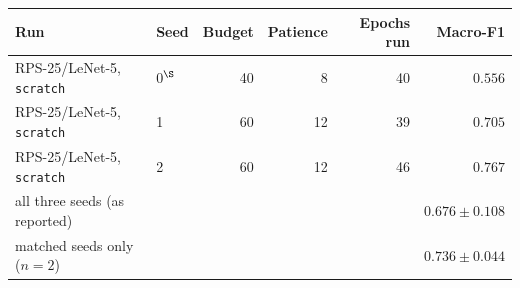 \begin{tabular}{@{}llrrrr@{}}
\toprule
Run & Seed & Budget & Patience & Epochs run & Macro-F1 \\
\midrule
RPS-25/LeNet-5, \texttt{scratch} & 0$^{\S}$ & 40 & 8 & 40 & $0.556$ \\
RPS-25/LeNet-5, \texttt{scratch} & 1 & 60 & 12 & 39 & $0.705$ \\
RPS-25/LeNet-5, \texttt{scratch} & 2 & 60 & 12 & 46 & $0.767$ \\
\midrule
all three seeds (as reported) & & & & & $0.676\pm0.108$ \\
matched seeds only ($n=2$) & & & & & $0.736\pm0.044$ \\
\bottomrule
\end{tabular}
